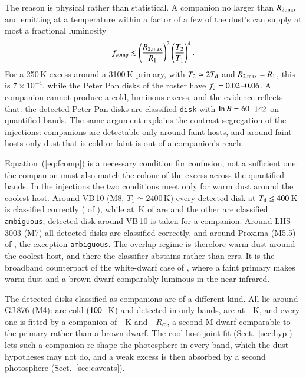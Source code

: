 \documentclass{aa}
\newcommand{\Rsun}{R_\odot}
\begin{document}
The reason is physical rather than statistical. A companion no larger than
$R_{2,\rm max}$ and emitting at a temperature within a factor of a few of the
dust's can supply at most a fractional luminosity
\begin{equation}
  f_{\rm comp} \lesssim \left(\frac{R_{2,\rm max}}{R_1}\right)^2
                        \left(\frac{T_2}{T_1}\right)^4 .
  \label{eq:fcomp}
\end{equation}
For a 250\,K excess around a 3100\,K primary, with $T_2 \simeq 2T_{\rm d}$ and
$R_{2,\rm max} = R_1$, this is $7\times10^{-4}$, while the Peter Pan disks of
the roster have $f_{\rm d} = 0.02$--$0.06$. A companion cannot produce a cold,
luminous excess, and the evidence reflects that: the detected Peter Pan disks are
classified \texttt{disk} with $\ln B = 60$--$142$ on \ppNq{} quantified bands.
The same argument explains the contrast segregation of the injections: companions
are detectable only around faint hosts, and around faint hosts only dust that is
cold or faint is out of a companion's reach.

Equation~(\ref{eq:fcomp}) is a necessary condition for confusion, not a
sufficient one: the companion must also match the colour of the excess across the
quantified bands. In the injections the two conditions meet only for warm dust
around the coolest host. Around VB\,10 (M8, $T_1 \simeq 2400$\,K) every detected
disk at $T_{\rm d} \le 400$\,K is classified correctly (\injVBcoolOK{} of \injVBcoolN), while at
\injVBwarmT\,K \injVBwarmOK{} of \injVBwarmN{} are and the other \injVBwarmAmb{} are classified
\texttt{ambiguous}; \injVBwarmComp{} detected disk around VB\,10 is taken for a companion. Around
LHS\,3003 (M7) all \injDetLHS{} detected disks are classified correctly, and around Proxima
(M5.5) \injDetOKProx{} of \injDetProx, the exception \texttt{ambiguous}. The overlap regime is
therefore warm dust around the coolest host, and there the classifier abstains
rather than errs. It is the broadband counterpart of the
white-dwarf case of \citet{owens2023}, where a faint primary makes warm dust and a
brown dwarf comparably luminous in the near-infrared.

The \injDetCompGJ{} detected disks classified as companions are of a different kind. All lie
around GJ\,876 (M4): \injGJcoldComp{} are cold ($100$--\injGJcoldTmax\,K) and
detected in only \injGJcoldNsig{} bands, \injGJwarmComp{} are at \injGJwarmTmin--\injGJwarmTmax\,K, and every one
is fitted by a companion of \injGJTtwoMin--\injGJTtwoMax\,K and \injGJRtwoMin--\injGJRtwoMax\,$\Rsun$, a second
M dwarf comparable to the primary rather than a brown dwarf. The cool-host joint
fit (Sect.~\ref{sec:hyp}) lets such a companion re-shape the photosphere in every
band, which the dust hypotheses may not do, and a weak excess is then absorbed by
a second photosphere (Sect.~\ref{sec:caveats}).
\end{document}
